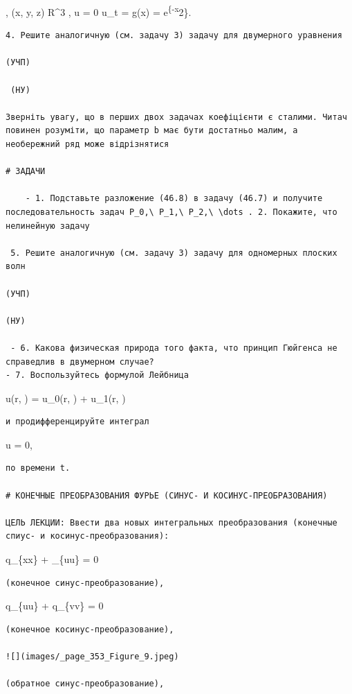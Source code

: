 \documentclass[
  ukrainian,
]{article}
\begin{document}
, (x, y, z) \in R\^{}3 , u = 0 u\_t = g(x) = e\textsuperscript{\{-x}2\}.

\begin{verbatim}
4. Решите аналогичную (см. задачу 3) задачу для двумерного уравнения

(УЧП)

 (НУ)

Зверніть увагу, що в перших двох задачах коефіцієнти є сталими. Читач повинен розуміти, що параметр b має бути достатньо малим, а необережний ряд може відрізнятися

# ЗАДАЧИ

    - 1. Подставьте разложение (46.8) в задачу (46.7) и получите последовательность задач P_0,\ P_1,\ P_2,\ \dots . 2. Покажите, что нелинейную задачу

 5. Решите аналогичную (см. задачу 3) задачу для одномерных плоских волн

(УЧП)

(НУ)

 - 6. Какова физическая природа того факта, что принцип Гюйгенса не справедлив в двумерном случае?
- 7. Воспользуйтесь формулой Лейбница
\end{verbatim}

u(r, \theta) = u\_0(r, \theta) + u\_1(r, \theta)

\begin{verbatim}
и продифференцируйте интеграл
\end{verbatim}

\Delta u = 0,

\begin{verbatim}
по времени t.

# КОНЕЧНЫЕ ПРЕОБРАЗОВАНИЯ ФУРЬЕ (СИНУС- И КОСИНУС-ПРЕОБРАЗОВАНИЯ)

ЦЕЛЬ ЛЕКЦИИ: Ввести два новых интегральных преобразования (конечные спиус- и косинус-преобразования):
\end{verbatim}

q\_\{xx\} + \varphi\_\{uu\} = 0

\begin{verbatim}
(конечное синус-преобразование),
\end{verbatim}

q\_\{uu\} + q\_\{vv\} = 0

\begin{verbatim}
(конечное косинус-преобразование),

![](images/_page_353_Figure_9.jpeg)

(обратное синус-преобразование),
\end{verbatim}
\end{document}
